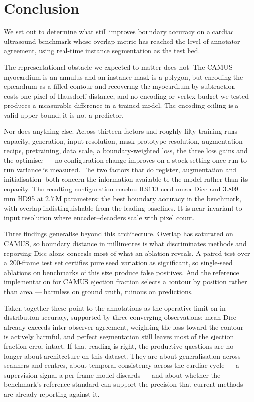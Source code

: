 \section{Conclusion}
\label{sec:conclusion}

We set out to determine what still improves boundary accuracy on a cardiac
ultrasound benchmark whose overlap metric has reached the level of annotator
agreement, using real-time instance segmentation as the test bed.

The representational obstacle we expected to matter does not. The CAMUS
myocardium is an annulus and an instance mask is a polygon, but encoding the
epicardium as a filled contour and recovering the myocardium by subtraction
costs one pixel of Hausdorff distance, and no encoding or vertex budget we
tested produces a measurable difference in a trained model. The encoding ceiling
is a valid upper bound; it is not a predictor.

Nor does anything else. Across thirteen factors and roughly fifty training runs
--- capacity, generation, input resolution, mask-prototype resolution,
augmentation recipe, pretraining, data scale, a boundary-weighted loss, the
three loss gains and the optimiser --- no configuration change improves on a
stock setting once run-to-run variance is measured. The two factors that do
register, augmentation and initialisation, both concern the information
available to the model rather than its capacity. The resulting configuration
reaches $0.9113$ seed-mean Dice and $3.809$\,mm HD95 at $2.7$\,M parameters:
the best boundary accuracy in the benchmark, with overlap indistinguishable from
the leading baselines. It is near-invariant to input resolution where
encoder--decoders scale with pixel count.

Three findings generalise beyond this architecture. Overlap has saturated on
CAMUS, so boundary distance in millimetres is what discriminates methods and
reporting Dice alone conceals most of what an ablation reveals. A paired test
over a 200-frame test set certifies pure seed variation as significant, so
single-seed ablations on benchmarks of this size produce false positives. And
the reference implementation for CAMUS ejection fraction selects a contour by
position rather than area --- harmless on ground truth, ruinous on predictions.

Taken together these point to the annotations as the operative limit on
in-distribution accuracy, supported by three converging observations: mean Dice
already exceeds inter-observer agreement, weighting the loss toward the contour
is actively harmful, and perfect segmentation still leaves most of the ejection
fraction error intact. If that reading is right, the productive questions are no
longer about architecture on this dataset. They are about generalisation across
scanners and centres, about temporal consistency across the cardiac cycle --- a
supervision signal a per-frame model discards --- and about whether the
benchmark's reference standard can support the precision that current methods
are already reporting against it.
